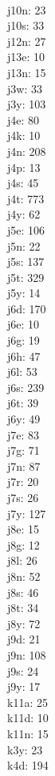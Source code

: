 \begin{multicols}{8}
  \\ j10n: 23
  \\ j10s: 33
  \\ j12n: 27
  \\ j13e: 10
  \\ j13n: 15
  \\ j3w: 33
  \\ j3y: 103
  \\ j4e: 80
  \\ j4k: 10
  \\ j4n: 208
  \\ j4p: 13
  \\ j4s: 45
  \\ j4t: 773
  \\ j4y: 62
  \\ j5e: 106
  \\ j5n: 22
  \\ j5s: 137
  \\ j5t: 329
  \\ j5y: 14
  \\ j6d: 170
  \\ j6e: 10
  \\ j6g: 19
  \\ j6h: 47
  \\ j6l: 53
  \\ j6s: 239
  \\ j6t: 39
  \\ j6y: 49
  \\ j7e: 83
  \\ j7g: 71
  \\ j7n: 87
  \\ j7r: 20
  \\ j7s: 26
  \\ j7y: 127
  \\ j8e: 15
  \\ j8g: 12
  \\ j8l: 26
  \\ j8n: 52
  \\ j8s: 46
  \\ j8t: 34
  \\ j8y: 72
  \\ j9d: 21
  \\ j9n: 108
  \\ j9s: 24
  \\ j9y: 17
  \\ k11a: 25
  \\ k11d: 10
  \\ k11n: 15
  \\ k3y: 23
  \\ k4d: 194

\end{multicols}
